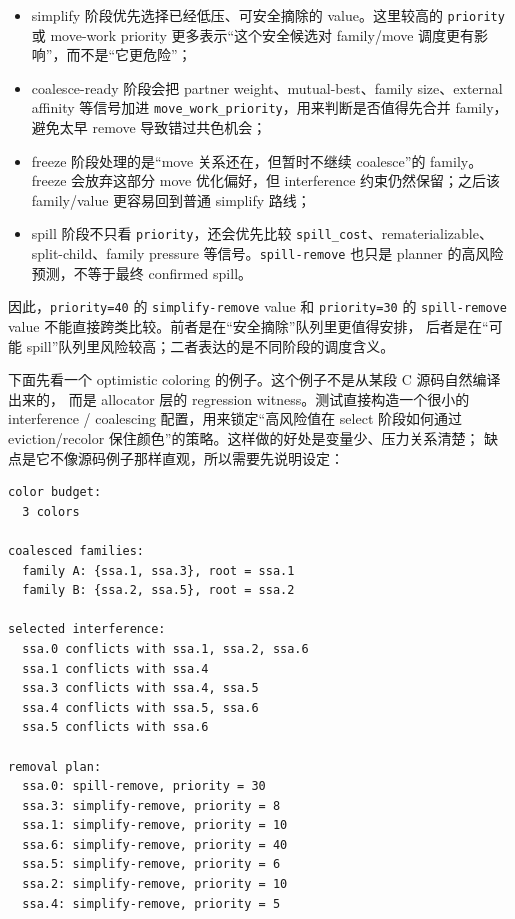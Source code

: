 \documentclass[UTF8,a4paper,11pt]{ctexart}
\begin{document}
\begin{itemize}
  \item simplify 阶段优先选择已经低压、可安全摘除的 value。这里较高的 \texttt{priority} 或 move-work priority 更多表示“这个安全候选对 family/move 调度更有影响”，而不是“它更危险”；
  \item coalesce-ready 阶段会把 partner weight、mutual-best、family size、external affinity 等信号加进 \texttt{move\_work\_priority}，用来判断是否值得先合并 family，避免太早 remove 导致错过共色机会；
  \item freeze 阶段处理的是“move 关系还在，但暂时不继续 coalesce”的 family。freeze 会放弃这部分 move 优化偏好，但 interference 约束仍然保留；之后该 family/value 更容易回到普通 simplify 路线；
  \item spill 阶段不只看 \texttt{priority}，还会优先比较 \texttt{spill\_cost}、rematerializable、split-child、family pressure 等信号。\texttt{spill-remove} 也只是 planner 的高风险预测，不等于最终 confirmed spill。
\end{itemize}

因此，\texttt{priority=40} 的 \texttt{simplify-remove} value 和 \texttt{priority=30} 的
\texttt{spill-remove} value 不能直接跨类比较。前者是在“安全摘除”队列里更值得安排，
后者是在“可能 spill”队列里风险较高；二者表达的是不同阶段的调度含义。

下面先看一个 optimistic coloring 的例子。这个例子不是从某段 C 源码自然编译出来的，
而是 allocator 层的 regression witness。测试直接构造一个很小的
interference / coalescing 配置，用来锁定“高风险值在 select 阶段如何通过
eviction/recolor 保住颜色”的策略。这样做的好处是变量少、压力关系清楚；
缺点是它不像源码例子那样直观，所以需要先说明设定：

\begin{lstlisting}[language={}]
color budget:
  3 colors

coalesced families:
  family A: {ssa.1, ssa.3}, root = ssa.1
  family B: {ssa.2, ssa.5}, root = ssa.2

selected interference:
  ssa.0 conflicts with ssa.1, ssa.2, ssa.6
  ssa.1 conflicts with ssa.4
  ssa.3 conflicts with ssa.4, ssa.5
  ssa.4 conflicts with ssa.5, ssa.6
  ssa.5 conflicts with ssa.6

removal plan:
  ssa.0: spill-remove, priority = 30
  ssa.3: simplify-remove, priority = 8
  ssa.1: simplify-remove, priority = 10
  ssa.6: simplify-remove, priority = 40
  ssa.5: simplify-remove, priority = 6
  ssa.2: simplify-remove, priority = 10
  ssa.4: simplify-remove, priority = 5
\end{lstlisting}
\end{document}
